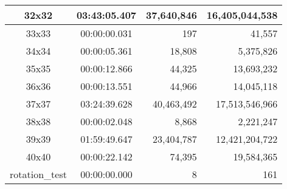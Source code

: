 \begin{center}
\begin{tabular}{|c|c|r|r|}
		32x32 & 03:43:05.407 & 37,640,846 & 16,405,044,538 \\ \hline
		33x33 & 00:00:00.031 & 197 & 41,557 \\ \hline
		34x34 & 00:00:05.361 & 18,808 & 5,375,826 \\ \hline
		35x35 & 00:00:12.866 & 44,325 & 13,693,232 \\ \hline
		36x36 & 00:00:13.551 & 44,966 & 14,045,118 \\ \hline
		37x37 & 03:24:39.628 & 40,463,492 & 17,513,546,966 \\ \hline
		38x38 & 00:00:02.048 & 8,868 & 2,221,247 \\ \hline
		39x39 & 01:59:49.647 & 23,404,787 & 12,421,204,722 \\ \hline
		40x40 & 00:00:22.142 & 74,395 & 19,584,365 \\ \hline
		rotation\_test & 00:00:00.000 & 8 & 161 \\ \hline

    \end{tabular}
\end{center}
